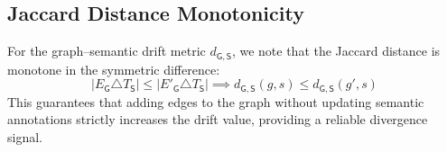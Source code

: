 \documentclass[11pt,twocolumn]{article}
\begin{document}
\subsection{Jaccard Distance Monotonicity}

For the graph--semantic drift metric $d_{\mathsf{G},\mathsf{S}}$, we note
that the Jaccard distance is monotone in the symmetric difference:
\[
  |E_\mathsf{G} \triangle T_\mathsf{S}| \leq
  |E'_\mathsf{G} \triangle T_\mathsf{S}|
  \implies
  d_{\mathsf{G},\mathsf{S}}(g, s) \leq
  d_{\mathsf{G},\mathsf{S}}(g', s)
\]
This guarantees that adding edges to the graph without updating semantic
annotations strictly increases the drift value, providing a reliable
divergence signal.
\end{document}
